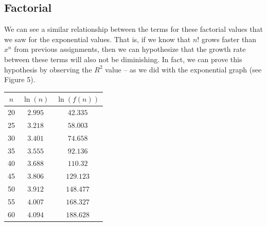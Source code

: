 \documentclass{article}
\begin{document}
    \subsection{Factorial}

    We can see a similar relationship between the terms for these factorial values that we saw for the exponential values. That is, if we know that $n!$ grows faster than $x^n$ from previous assignments, then we can hypothesize that the growth rate between these terms will also not be diminishing. In fact, we can prove this hypothesis by observing the $R^2$ value -- as we did with the exponential graph (see Figure 5). 


\begin{minipage}{0.3\textwidth} %
    \centering

    
    
    \begin{tabular}{c|c|c}
        $n$ & $\ln(n)$ & $\ln(f(n))$ \\ \hline
        20 & $2.995$ & $42.335$ \\\hline
        25 & $3.218$ & $58.003$  \\\hline
        30 & $3.401$ & $74.658$\\\hline
        35 & $3.555$ & $92.136$\\\hline
        40 & $3.688$ & $110.32$\\ \hline
        45 & $3.806$ & $129.123$\\ \hline
        50 & $3.912$ & $148.477$\\ \hline
        55 & $4.007$ & $168.327$\\ \hline
        60 & $4.094$ & $188.628$\\
    \end{tabular}

    
    
\end{minipage}%
\end{document}
